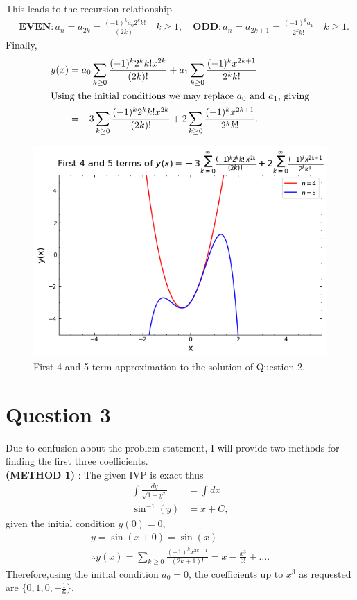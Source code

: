 \documentclass[
	12pt,
	]{article}
\theoremstyle{definition}
\theoremstyle{definition}
\theoremstyle{definition}
\theoremstyle{definition}
\theoremstyle{definition}
\theoremstyle{example}
\theoremstyle{note}
\theoremstyle{remark}
\theoremstyle{example}
\begin{document}
						This leads to the recursion relationship 
				\begin{align*}
								&\textbf{EVEN} : a_{n} = a_{2k} = \frac{(-1)^{k}a_{0}2^{k}k!}{(2k)!} \quad k \ge 1,\quad 
								\textbf{ODD} : a_{n} = a_{2k+1} = \frac{(-1)^{k} a_{1}}{2^{k}k!} \quad k\ge 1.
							\end{align*}
				Finally, 
				\begin{align*}
					y(x) &= a_{0}\sum_{k \ge 0} \frac{(-1)^{k}2^{k}k!x^{2k}}{(2k)!} + a_{1}\sum_{k \ge 0}\frac{(-1)^{k}x^{2k+1}}{2^{k}k!} \\
					\intertext{Using the initial conditions we may replace $a_{0}$ and $a_{1}$, giving}
					&= -3 \sum_{k \ge 0 } \frac{(-1)^{k}2^{k}k!x^{2k}}{(2k)!} + 2\sum_{k \ge 0}\frac{(-1)^{k}x^{2k+1}}{2^{k}k!}.
				\end{align*}
				\begin{figure}[H]
					\centering 
					\includegraphics[width=0.9\linewidth]{MATH325_Ass5_Fig.png}
					\captionsetup{margin=1.5cm , justification=raggedright} \caption{First 4 and 5 term approximation to the solution of Question 2.}
				\end{figure}	
				
				\section*{Question 3}
				Due to confusion about the problem statement, I will provide two methods for finding the first three coefficients. \\
				
				\noindent \textbf{(METHOD 1)} : The given IVP is exact thus\\ 
					\begin{align*}
					\int \frac{dy}{\sqrt{1-y^2}} &= \int dx \\
					\sin^{-1}(y) &= x+C,
					\end{align*}
					given the initial condition $y(0)=0$, 
					\begin{gather*}
					y = \sin(x+0) = \sin(x)\\
					\therefore y(x) = \sum_{k\ge 0} \frac{(-1)^k x^{2k+1}}{(2k+1)!} = x - \frac{x^3}{3!} + \dots.
					\end{gather*}
					Therefore,using the initial condition $a_{0} = 0$, the coefficients up to $x^3$ as requested are $\{0,1,0, -\frac16 \}$. \\
					
\end{document}
